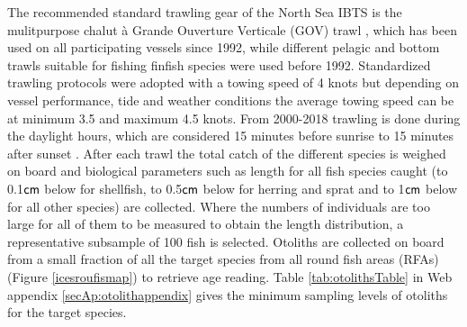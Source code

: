 \documentclass[a4paper 12pt]{article}
\numberwithin{equation}{section}
\newcommand{\cm}{\textnormal{\sffamily cm}\xspace}
\begin{document}
\indent The recommended standard trawling gear of the North Sea IBTS is the mulitpurpose chalut {\`a} Grande Ouverture Verticale (GOV) trawl \citep{ICES2012}, which has been used on all participating vessels since 1992, while different pelagic and bottom trawls suitable for fishing finfish species were used before 1992. Standardized trawling protocols were adopted with a towing speed of 4 knots but depending on vessel performance, tide and weather conditions the average towing speed can be at minimum 3.5 and maximum 4.5 knots. From 2000-2018 trawling is done during the daylight hours, which are considered 15 minutes before sunrise to 15 minutes  after sunset \citep{ICES2012}. After each trawl the total catch of the different species is weighed on board and biological parameters such as length for all fish species caught (to 0.1$\cm$ below for shellfish, to 0.5$\cm$ below for herring and sprat and to 1$\cm$ below for all other species) are collected. Where the numbers of individuals are too large for all of them  to be measured to obtain the length distribution, a representative subsample of 100 fish is selected. Otoliths are collected on board from a small fraction of all the target species from all  round fish areas (RFAs) (Figure \ref{icesroufismap}) to retrieve age reading. Table \ref{tab:otolithsTable} in Web appendix \ref{secAp:otolithappendix} gives the minimum sampling levels of otoliths for the target species.
\end{document}
